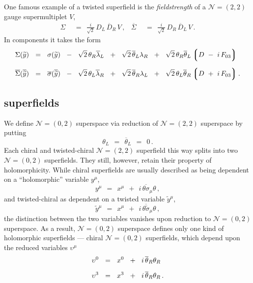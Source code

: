 \documentclass[epsfig,12pt]{article}
\def\beq{\begin{equation}}
\def\eeq{\end{equation}}
\newcommand{\ntwot}{${\mathcal N}= \left(2,2\right) $ }
\newcommand{\ntwoo}{${\mathcal N}= \left(0,2\right) $ }
\newcommand{\ntwoon}{${\mathcal N}= \left(0,2\right)$}
\newcommand{\wt}{\widetilde}
\newcommand{\ov}{\overline}
\newcommand{\lgr}{\left\lgroup}
\newcommand{\rgr}{\right\rgroup}
\begin{document}
	One famous example of a twisted superfield is the {\it fieldstrength}
	of a \ntwot gauge supermultiplet $ V $,
\begin{align}
	\Sigma    & ~~=~~    \frac{i}{\sqrt 2}\, D_L\, \ov D{}_R\, V\,,
	&
	\ov \Sigma    & ~~=~~    \frac{i}{\sqrt 2}\, D_R\, \ov D{}_L\, V\,.
\end{align}
	In components it takes the form
\begin{align*}
	\Sigma(\wt y)    & ~~=~~    \sigma(\wt y)  ~~-~~  \sqrt{2}\, \theta_R \ov\lambda{}_L
						   ~~+~~  \sqrt{2}\, \ov\theta{}_L \lambda_R
						   ~~+~~  \sqrt{2}\, \theta_R \ov\theta{}_L \lgr D ~-~ i\, F_{03} \rgr
	\\[2mm]
	\ov\Sigma(\ov{\wt y})    & ~~=~~    \ov\sigma(\ov{\wt y})  ~~-~~ \sqrt{2}\, \theta_L \ov\lambda{}_R
								   ~~+~~ \sqrt{2}\, \ov\theta{}_R \lambda_L
								   ~~+~~ \sqrt{2}\, \theta_L \ov\theta{}_R \lgr D ~+~ i\, F_{03} \rgr
	.
\end{align*}




\subsection{\boldmath{\ntwoon} superfields}

	We define \ntwoo superspace via reduction of \ntwot superspace by putting
\beq
	\theta_L    ~~=~~    \ov\theta{}_L    ~~=~~    0\,.
\eeq
	Each chiral and twisted-chiral \ntwot superfield this way splits into two \ntwoo superfields.
	They still, however, retain their property of holomorphicity.
	While chiral superfields are usually described as being dependent on
	a ``holomorphic'' variable $ y^\mu $,
\beq
	y^\mu    ~~=~~    x^\mu    ~~+~~    i\,\ov{\theta\sigma}{}_\mu\theta\,,
\eeq
	and twisted-chiral as dependent on a twisted variable $ \wt y{}^\mu $,
\beq
	\wt y{}^\mu    ~~=~~    x^\mu    ~~+~~    i\,\ov{\theta\wt\sigma}{}_\mu\theta\,,
\eeq
	the distinction between the two variables vanishes upon reduction to \ntwoo superspace.
	As a result, \ntwoo superspace defines only one kind of holomorphic superfields --- 
	chiral \ntwoo superfields, which depend upon the reduced variables $ \upsilon^\mu $
\begin{align}
%
\notag
	\upsilon^0 &    ~~=~~    x^0  ~~+~~  i\,\ov\theta{}_R\theta_R
	\\[2mm]
%
	\upsilon^3 &    ~~=~~    x^3  ~~+~~  i\,\ov\theta{}_R\theta_R\,.
\end{align}
\end{document}
